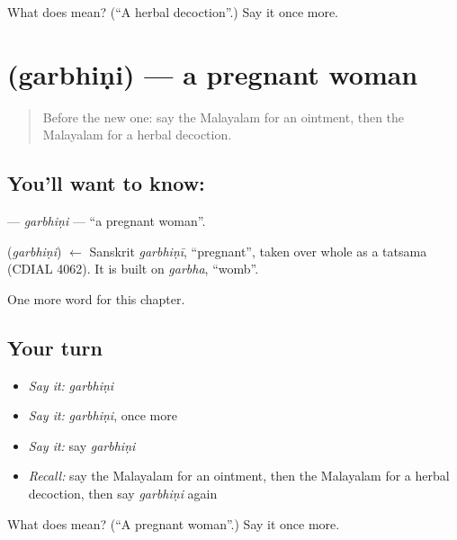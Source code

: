 \begin{tcolorbox}[breakable,colback=teal!4,colframe=teal!35!black,title={Before you move on}]
What does  mean? (\textquotedblleft{}A herbal decoction\textquotedblright{}.) Say it once more.
\end{tcolorbox}
\section[\texorpdfstring{\ml{ഗർഭിണി} (garbhiṇi)}{ഗർഭിണി (garbhiṇi)}]{ (garbhiṇi) — a pregnant woman}

\label{lesson:ML-C313-garbhini}



\begin{quote}
Before the new one: say the Malayalam for an ointment, then the Malayalam for a herbal decoction.
\end{quote}

\subsection*{You'll want to know: }
\textbf{} — \emph{garbhiṇi} — \textquotedblleft{}a pregnant woman\textquotedblright{}.

\begin{cousinweb}
\textbf{} (\emph{garbhiṇi}) $\leftarrow$ Sanskrit \emph{garbhiṇī}, \textquotedblleft{}pregnant\textquotedblright{}, taken over whole as a tatsama (CDIAL 4062). It is built on \emph{garbha}, \textquotedblleft{}womb\textquotedblright{}.
\end{cousinweb}

\begin{grammarlens}[title={What you've built}]
One more word for this chapter.
\end{grammarlens}

\subsection*{Your turn}
\begin{itemize}
\raggedright
  \item \emph{Say it:} \emph{garbhiṇi}
  \item \emph{Say it:} \emph{garbhiṇi}, once more
  \item \emph{Say it:} say \emph{garbhiṇi}
  \item \emph{Recall:} say the Malayalam for an ointment, then the Malayalam for a herbal decoction, then say \emph{garbhiṇi} again
\end{itemize}

\begin{tcolorbox}[breakable,colback=teal!4,colframe=teal!35!black,title={Before you move on}]
What does  mean? (\textquotedblleft{}A pregnant woman\textquotedblright{}.) Say it once more.
\end{tcolorbox}
